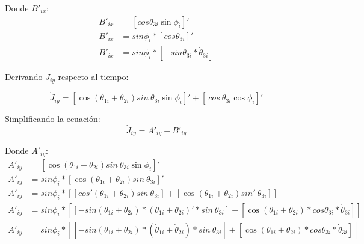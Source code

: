             Donde $B'_{ix}$:
            \begin{align*}
                 B'_{ix}&= \left[ cos  \theta _{3i}\sin  \phi _{i} \right] ' \\
                 B'_{ix}&=sin \phi _{i}\ast \left[ cos  \theta _{3i} \right] ' \\
                 B'_{ix}&=sin \phi _{i}\ast \left[ -sin \theta _{3i}\ast\dot{ \theta }_{3i} \right]  
            \end{align*}

            
            Derivando  $J_{iy}$ respecto al tiempo:

            \begin{equation*}
                  \dot{J}_{iy}= \left[ \cos  \left(  \theta _{1i}+ \theta _{2i} \right) sin~ \theta _{3i}\sin  \phi _{i} \right] '+ \left[ ~cos~ \theta _{3i}\cos  \phi_{i} \right] ' 
            \end{equation*}
            
            Simplificando la ecuación:
            \begin{equation}
                \dot{J}_{iy}=A'_{iy}+B'_{iy}  
            \end{equation}
            
            Donde $A'_{iy}$:
            \begin{align*}
                 A'_{iy}&= \left[ \cos  \left(  \theta _{1i}+ \theta _{2i} \right) sin~ \theta _{3i}\sin  \phi _{i} \right] ' \\
                 A'_{iy}&=sin \phi _{i}\ast \left[ \cos  \left(  \theta _{1i}+ \theta _{2i} \right) sin~ \theta _{3i} \right] ' \\
                 A'_{iy}&=sin \phi _{i}\ast \left[  \left[ cos' \left(  \theta _{1i}+ \theta _{2i} \right) sin~ \theta _{3i} \right] + \left[ \cos  \left(  \theta _{1i}+ \theta _{2i} \right) sin'~ \theta _{3i} \right]  \right]  \\
                 A'_{iy}&=sin \phi _{i}\ast \left[  \left[ -sin \left(  \theta _{1i}+ \theta _{2i} \right) \ast \left(  \theta _{1i}+ \theta _{2i} \right) '\ast sin~ \theta _{3i} \right] + \left[ \cos  \left(  \theta _{1i}+ \theta _{2i} \right) \ast cos  \theta _{3i}\ast\dot{ \theta }_{3i} \right]  \right] \\
                 A'_{iy}&=sin \phi _{i}\ast \left[  \left[ -sin \left(  \theta _{1i}+ \theta _{2i} \right) \ast \left( \dot{ \theta }_{1i}+\dot{ \theta }_{2i} \right) \ast sin~ \theta _{3i} \right] + \left[ \cos  \left(  \theta _{1i}+ \theta _{2i} \right) \ast cos  \theta _{3i}\ast\dot{ \theta }_{3i} \right]  \right]                              
            \end{align*}
            
